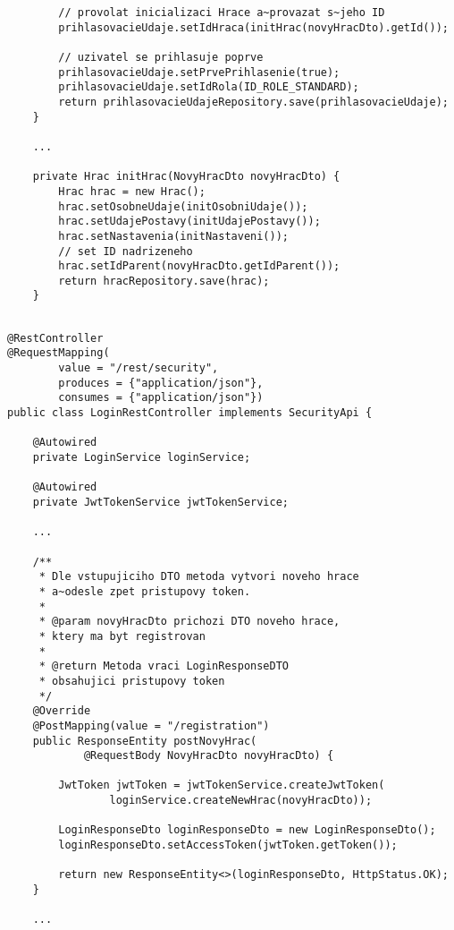 \documentclass[twoside, 12pt]{article}
\begin{document}
{{\begin{lstlisting}
        // provolat inicializaci Hrace a~provazat s~jeho ID
        prihlasovacieUdaje.setIdHraca(initHrac(novyHracDto).getId());

        // uzivatel se prihlasuje poprve
        prihlasovacieUdaje.setPrvePrihlasenie(true);
        prihlasovacieUdaje.setIdRola(ID_ROLE_STANDARD);
        return prihlasovacieUdajeRepository.save(prihlasovacieUdaje);
    }

    ...

    private Hrac initHrac(NovyHracDto novyHracDto) {
        Hrac hrac = new Hrac();
        hrac.setOsobneUdaje(initOsobniUdaje());
        hrac.setUdajePostavy(initUdajePostavy());
        hrac.setNastavenia(initNastaveni());
        // set ID nadrizeneho
        hrac.setIdParent(novyHracDto.getIdParent());
        return hracRepository.save(hrac);
    }
\end{lstlisting}

\clearpage


\begin{lstlisting}

@RestController
@RequestMapping(
        value = "/rest/security",
        produces = {"application/json"},
        consumes = {"application/json"})
public class LoginRestController implements SecurityApi {

    @Autowired
    private LoginService loginService;

    @Autowired
    private JwtTokenService jwtTokenService;

    ...

    /**
     * Dle vstupujiciho DTO metoda vytvori noveho hrace
     * a~odesle zpet pristupovy token.
     *
     * @param novyHracDto prichozi DTO noveho hrace,
     * ktery ma byt registrovan
     *
     * @return Metoda vraci LoginResponseDTO
     * obsahujici pristupovy token
     */
    @Override
    @PostMapping(value = "/registration")
    public ResponseEntity postNovyHrac(
            @RequestBody NovyHracDto novyHracDto) {

        JwtToken jwtToken = jwtTokenService.createJwtToken(
                loginService.createNewHrac(novyHracDto));

        LoginResponseDto loginResponseDto = new LoginResponseDto();
        loginResponseDto.setAccessToken(jwtToken.getToken());

        return new ResponseEntity<>(loginResponseDto, HttpStatus.OK);
    }

    ...


\end{lstlisting}}}
\end{document}
